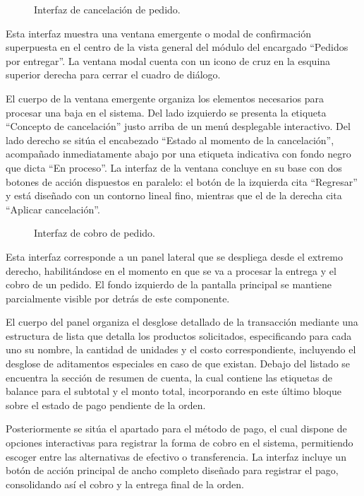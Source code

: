 \begin{figure}[H]
    \centering
    
    \caption{Interfaz de cancelación de pedido.}
    \label{fig:ui-ent-03}
\end{figure}

Esta interfaz muestra una ventana emergente o modal de confirmación superpuesta en el centro de la vista general del módulo del encargado ``Pedidos por entregar''. La ventana modal cuenta con un icono de cruz en la esquina superior derecha para cerrar el cuadro de diálogo. 

El cuerpo de la ventana emergente organiza los elementos necesarios para procesar una baja en el sistema. Del lado izquierdo se presenta la etiqueta ``Concepto de cancelación'' justo arriba de un menú desplegable interactivo. Del lado derecho se sitúa el encabezado ``Estado al momento de la cancelación'', acompañado inmediatamente abajo por una etiqueta indicativa con fondo negro que dicta ``En proceso''. La interfaz de la ventana concluye en su base con dos botones de acción dispuestos en paralelo: el botón de la izquierda cita ``Regresar'' y está diseñado con un contorno lineal fino, mientras que el de la derecha cita ``Aplicar cancelación''.

\begin{figure}[H]
    \centering
    
    \caption{Interfaz de cobro de pedido.}
    \label{fig:ui-ent-04-b}
\end{figure}

Esta interfaz corresponde a un panel lateral que se despliega desde el extremo derecho, habilitándose en el momento en que se va a procesar la entrega y el cobro de un pedido. El fondo izquierdo de la pantalla principal se mantiene parcialmente visible por detrás de este componente. 

El cuerpo del panel organiza el desglose detallado de la transacción mediante una estructura de lista que detalla los productos solicitados, especificando para cada uno su nombre, la cantidad de unidades y el costo correspondiente, incluyendo el desglose de aditamentos especiales en caso de que existan. Debajo del listado se encuentra la sección de resumen de cuenta, la cual contiene las etiquetas de balance para el subtotal y el monto total, incorporando en este último bloque sobre el estado de pago pendiente de la orden. 

Posteriormente se sitúa el apartado para el método de pago, el cual dispone de opciones interactivas para registrar la forma de cobro en el sistema, permitiendo escoger entre las alternativas de efectivo o transferencia. La interfaz incluye un botón de acción principal de ancho completo diseñado para registrar el pago, consolidando así el cobro y la entrega final de la orden.

